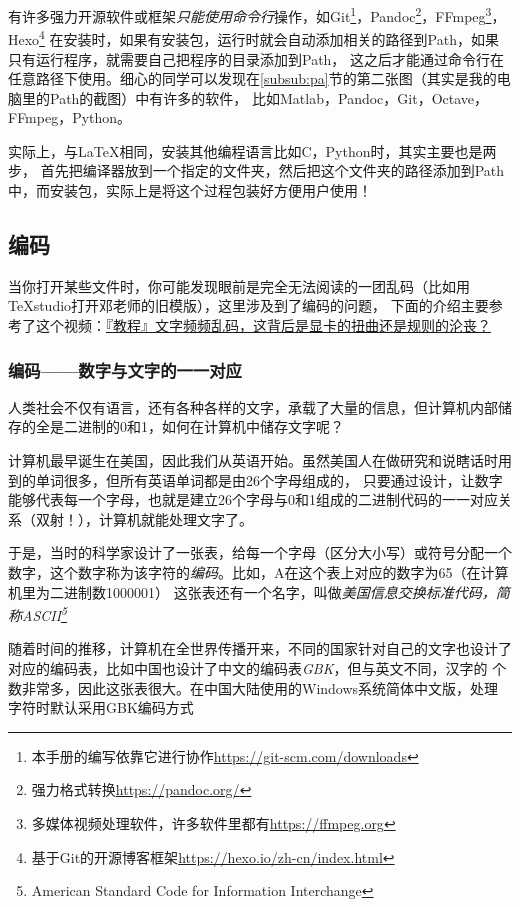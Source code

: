 有许多强力开源软件或框架\emph{只能使用命令行}操作，如Git\footnote{本手册的编写依靠它进行协作\url{https://git-scm.com/downloads}}，Pandoc\footnote{强力格式转换\url{https://pandoc.org/}}，FFmpeg\footnote{多媒体视频处理软件，许多软件里都有\url{https://ffmpeg.org}}，
Hexo\footnote{基于Git的开源博客框架\url{https://hexo.io/zh-cn/index.html}}
在安装时，如果有安装包，运行时就会自动添加相关的路径到Path，如果只有运行程序，就需要自己把程序的目录添加到Path，
这之后才能通过命令行在任意路径下使用。细心的同学可以发现在\ref{subsub:pa}节的第二张图（其实是我的电脑里的Path的截图）中有许多的软件，
比如Matlab，Pandoc，Git，Octave，FFmpeg，Python。

实际上，与\LaTeX{}相同，安装其他编程语言比如C，Python时，其实主要也是两步，
首先把编译器放到一个指定的文件夹，然后把这个文件夹的路径添加到Path中，而安装包，实际上是将这个过程包装好方便用户使用！


\subsection{编码}


当你打开某些文件时，你可能发现眼前是完全无法阅读的一团乱码（比如用TeXstudio打开邓老师的旧模版），这里涉及到了编码的问题，
下面的介绍主要参考了这个视频：\href{https://www.bilibili.com/video/BV1ai4y1x7Uz?spm_id_from=333.999.0.0}{『教程』文字频频乱码，这背后是显卡的扭曲还是规则的沦丧？}



\subsubsection{编码——数字与文字的一一对应}


人类社会不仅有语言，还有各种各样的文字，承载了大量的信息，但计算机内部储存的全是二进制的0和1，如何在计算机中储存文字呢？

计算机最早诞生在美国，因此我们从英语开始。虽然美国人在做研究和说瞎话时用到的单词很多，但所有英语单词都是由26个字母组成的，
只要通过设计，让数字能够代表每一个字母，也就是建立26个字母与0和1组成的二进制代码的一一对应关系（双射！），计算机就能处理文字了。

于是，当时的科学家设计了一张表，给每一个字母（区分大小写）或符号分配一个数字，这个数字称为该字符的\emph{编码}。比如，A在这个表上对应的数字为65（在计算机里为二进制数1000001）
这张表还有一个名字，叫做\emph{美国信息交换标准代码，简称ASCII\footnote{American Standard Code for Information Interchange}}

随着时间的推移，计算机在全世界传播开来，不同的国家针对自己的文字也设计了对应的编码表，比如中国也设计了中文的编码表\emph{GBK}，但与英文不同，汉字的
个数非常多，因此这张表很大。在中国大陆使用的Windows系统简体中文版，处理字符时默认采用GBK编码方式
